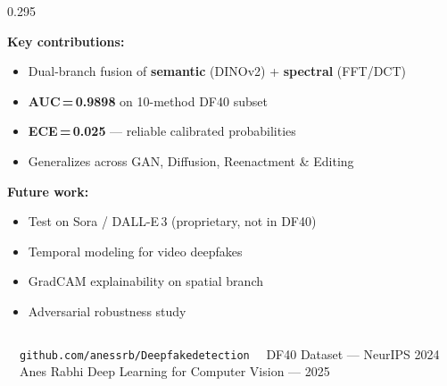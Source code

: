 \documentclass[final]{beamer}
\begin{document}
\begin{frame}[t]{}
\begin{columns}[T]
\begin{column}{0.295\linewidth}
\begin{tcolorbox}[card, title={\faCheckCircle\ \ Conclusions \& Future Work},
  colbacktitle=Green, coltitle=White]
\RaggedRight\small
\textbf{Key contributions:}
\begin{itemize}[leftmargin=1.3em,itemsep=2pt]
  \item[\textcolor{Green}{\faCheck}]
    Dual-branch fusion of \textbf{semantic} (DINOv2) + \textbf{spectral} (FFT/DCT)
  \item[\textcolor{Green}{\faCheck}]
    \textbf{AUC\,=\,0.9898} on 10-method DF40 subset
  \item[\textcolor{Green}{\faCheck}]
    \textbf{ECE\,=\,0.025} — reliable calibrated probabilities
  \item[\textcolor{Green}{\faCheck}]
    Generalizes across GAN, Diffusion, Reenactment \& Editing
\end{itemize}

\vspace{5pt}
\textbf{Future work:}
\begin{itemize}[leftmargin=1.3em,itemsep=2pt]
  \item[\textcolor{Amber}{\faArrowRight}]
    Test on Sora / DALL-E\,3 (proprietary, not in DF40)
  \item[\textcolor{Amber}{\faArrowRight}]
    Temporal modeling for video deepfakes
  \item[\textcolor{Amber}{\faArrowRight}]
    GradCAM explainability on spatial branch
  \item[\textcolor{Amber}{\faArrowRight}]
    Adversarial robustness study
\end{itemize}
\end{tcolorbox}

\end{column}
\end{columns}

\vspace{10pt}

\begin{tcolorbox}[
  enhanced, arc=0pt, boxrule=0pt,
  colback=Navy, borderline north={4pt}{0pt}{Red},
  top=7pt, bottom=7pt, left=18pt, right=18pt,
]
\begin{center}
{\small\sffamily\color{White!70}
  \faCode\ \ \texttt{github.com/anessrb/Deepfakedetection}
  \quad\textbullet\quad
  \faDatabase\ \ DF40 Dataset — NeurIPS 2024
  \quad\textbullet\quad
  \faEnvelope\ \ Anes Rabhi
  \hfill
  Deep Learning for Computer Vision — 2025
}
\end{center}
\end{tcolorbox}

\end{frame}
\end{document}
